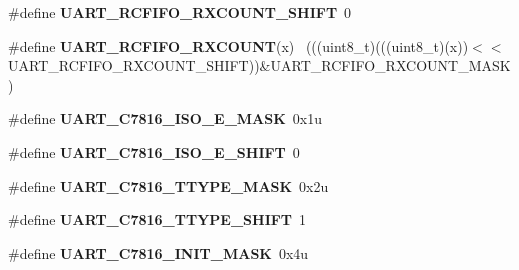 \begin{DoxyCompactItemize}
\item 
\hypertarget{group___u_a_r_t___register___masks_gaf167fbdec63bf8287e0c1fa12ad7f39f}{}\#define {\bfseries U\+A\+R\+T\+\_\+\+R\+C\+F\+I\+F\+O\+\_\+\+R\+X\+C\+O\+U\+N\+T\+\_\+\+S\+H\+I\+F\+T}~0\label{group___u_a_r_t___register___masks_gaf167fbdec63bf8287e0c1fa12ad7f39f}

\item 
\hypertarget{group___u_a_r_t___register___masks_gaabce88d9705d1c57459758cdb6a93c71}{}\#define {\bfseries U\+A\+R\+T\+\_\+\+R\+C\+F\+I\+F\+O\+\_\+\+R\+X\+C\+O\+U\+N\+T}(x)                                  ~(((uint8\+\_\+t)(((uint8\+\_\+t)(x))$<$$<$U\+A\+R\+T\+\_\+\+R\+C\+F\+I\+F\+O\+\_\+\+R\+X\+C\+O\+U\+N\+T\+\_\+\+S\+H\+I\+F\+T))\&U\+A\+R\+T\+\_\+\+R\+C\+F\+I\+F\+O\+\_\+\+R\+X\+C\+O\+U\+N\+T\+\_\+\+M\+A\+S\+K)\label{group___u_a_r_t___register___masks_gaabce88d9705d1c57459758cdb6a93c71}

\item 
\hypertarget{group___u_a_r_t___register___masks_gae34238a46464deaac39303c8b11431a2}{}\#define {\bfseries U\+A\+R\+T\+\_\+\+C7816\+\_\+\+I\+S\+O\+\_\+E\+\_\+\+M\+A\+S\+K}~0x1u\label{group___u_a_r_t___register___masks_gae34238a46464deaac39303c8b11431a2}

\item 
\hypertarget{group___u_a_r_t___register___masks_gaee54546d1f78919cbcae5b7a5ec44f17}{}\#define {\bfseries U\+A\+R\+T\+\_\+\+C7816\+\_\+\+I\+S\+O\+\_\+E\+\_\+\+S\+H\+I\+F\+T}~0\label{group___u_a_r_t___register___masks_gaee54546d1f78919cbcae5b7a5ec44f17}

\item 
\hypertarget{group___u_a_r_t___register___masks_ga5c2601e69d81abd9d74da1eedefe0073}{}\#define {\bfseries U\+A\+R\+T\+\_\+\+C7816\+\_\+\+T\+T\+Y\+P\+E\+\_\+\+M\+A\+S\+K}~0x2u\label{group___u_a_r_t___register___masks_ga5c2601e69d81abd9d74da1eedefe0073}

\item 
\hypertarget{group___u_a_r_t___register___masks_ga53eb4e563ed15c4c1e73d1fd15a77b2e}{}\#define {\bfseries U\+A\+R\+T\+\_\+\+C7816\+\_\+\+T\+T\+Y\+P\+E\+\_\+\+S\+H\+I\+F\+T}~1\label{group___u_a_r_t___register___masks_ga53eb4e563ed15c4c1e73d1fd15a77b2e}

\item 
\hypertarget{group___u_a_r_t___register___masks_ga52afeea9fbaec9489c45792a907b195b}{}\#define {\bfseries U\+A\+R\+T\+\_\+\+C7816\+\_\+\+I\+N\+I\+T\+\_\+\+M\+A\+S\+K}~0x4u\label{group___u_a_r_t___register___masks_ga52afeea9fbaec9489c45792a907b195b}


\end{DoxyCompactItemize}
